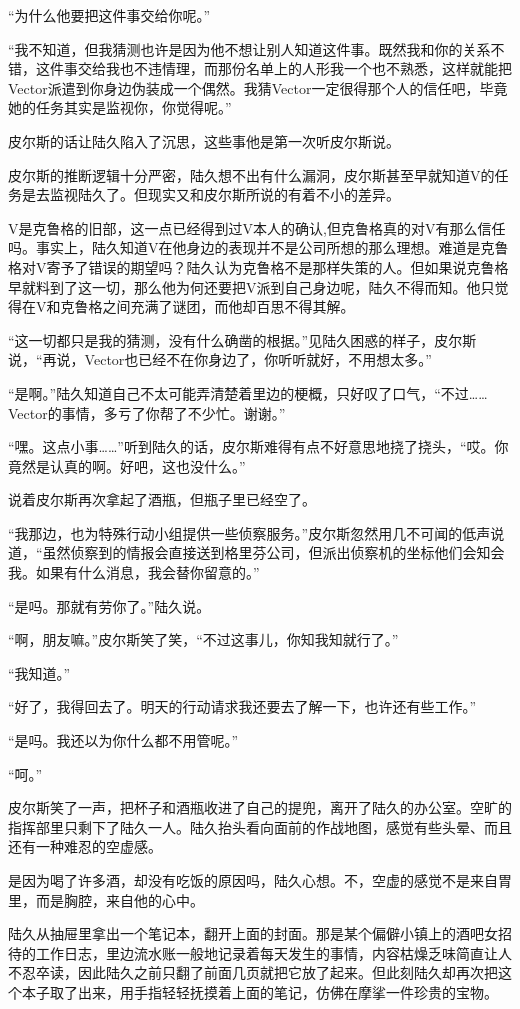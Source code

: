 “为什么他要把这件事交给你呢。”

“我不知道，但我猜测也许是因为他不想让别人知道这件事。既然我和你的关系不错，这件事交给我也不违情理，而那份名单上的人形我一个也不熟悉，这样就能把Vector派遣到你身边伪装成一个偶然。我猜Vector一定很得那个人的信任吧，毕竟她的任务其实是监视你，你觉得呢。”

皮尔斯的话让陆久陷入了沉思，这些事他是第一次听皮尔斯说。

皮尔斯的推断逻辑十分严密，陆久想不出有什么漏洞，皮尔斯甚至早就知道V的任务是去监视陆久了。但现实又和皮尔斯所说的有着不小的差异。

V是克鲁格的旧部，这一点已经得到过V本人的确认,但克鲁格真的对V有那么信任吗。事实上，陆久知道V在他身边的表现并不是公司所想的那么理想。难道是克鲁格对V寄予了错误的期望吗？陆久认为克鲁格不是那样失策的人。但如果说克鲁格早就料到了这一切，那么他为何还要把V派到自己身边呢，陆久不得而知。他只觉得在V和克鲁格之间充满了谜团，而他却百思不得其解。

“这一切都只是我的猜测，没有什么确凿的根据。”见陆久困惑的样子，皮尔斯说，“再说，Vector也已经不在你身边了，你听听就好，不用想太多。”

“是啊。”陆久知道自己不太可能弄清楚着里边的梗概，只好叹了口气，“不过……Vector的事情，多亏了你帮了不少忙。谢谢。”

“嘿。这点小事……”听到陆久的话，皮尔斯难得有点不好意思地挠了挠头，“哎。你竟然是认真的啊。好吧，这也没什么。”

说着皮尔斯再次拿起了酒瓶，但瓶子里已经空了。

“我那边，也为特殊行动小组提供一些侦察服务。”皮尔斯忽然用几不可闻的低声说道，“虽然侦察到的情报会直接送到格里芬公司，但派出侦察机的坐标他们会知会我。如果有什么消息，我会替你留意的。”

“是吗。那就有劳你了。”陆久说。

“啊，朋友嘛。”皮尔斯笑了笑，“不过这事儿，你知我知就行了。”

“我知道。”

“好了，我得回去了。明天的行动请求我还要去了解一下，也许还有些工作。”

“是吗。我还以为你什么都不用管呢。”

“呵。”

皮尔斯笑了一声，把杯子和酒瓶收进了自己的提兜，离开了陆久的办公室。空旷的指挥部里只剩下了陆久一人。陆久抬头看向面前的作战地图，感觉有些头晕、而且还有一种难忍的空虚感。

是因为喝了许多酒，却没有吃饭的原因吗，陆久心想。不，空虚的感觉不是来自胃里，而是胸腔，来自他的心中。

陆久从抽屉里拿出一个笔记本，翻开上面的封面。那是某个偏僻小镇上的酒吧女招待的工作日志，里边流水账一般地记录着每天发生的事情，内容枯燥乏味简直让人不忍卒读，因此陆久之前只翻了前面几页就把它放了起来。但此刻陆久却再次把这个本子取了出来，用手指轻轻抚摸着上面的笔记，仿佛在摩挲一件珍贵的宝物。

